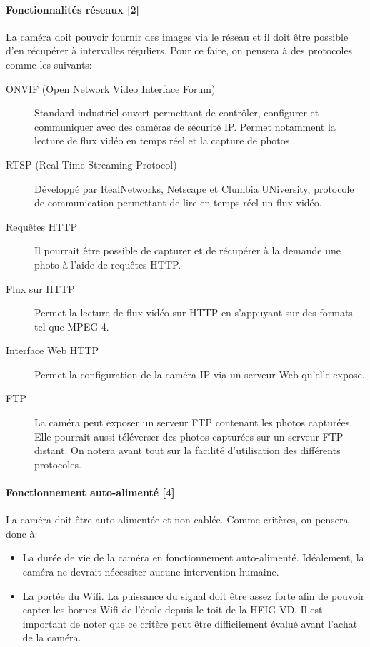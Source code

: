 \paragraph{Fonctionnalités réseaux [2]}
La caméra doit pouvoir fournir des images via le réseau et il doit être possible d'en récupérer à intervalles réguliers. Pour ce faire, on pensera à des protocoles comme les suivants: 
\begin{description}
    \item[ONVIF (Open Network Video Interface Forum)] Standard industriel ouvert permettant de contrôler, configurer et communiquer avec des caméras de sécurité IP. Permet notamment la lecture de flux vidéo en temps réel et la capture de photos \autocite{wiki:onvif}
    \item[RTSP (Real Time Streaming Protocol)] Développé par RealNetworks, Netscape et Clumbia UNiversity, protocole de communication permettant de lire en temps réel un flux vidéo. \autocite{wiki:RTSP}
    \item[Requêtes HTTP] Il pourrait être possible de capturer et de récupérer à la demande une photo à l'aide de requêtes HTTP.
    \item[Flux sur HTTP] Permet la lecture de flux vidéo sur HTTP en s'appuyant sur des formats tel que MPEG-4.
    \item[Interface Web HTTP] Permet la configuration de la caméra IP via un serveur Web qu'elle expose. 
    \item[FTP] La caméra peut exposer un serveur FTP contenant les photos capturées. Elle pourrait aussi téléverser des photos capturées sur un serveur FTP distant.
On notera avant tout sur la facilité d'utilisation des différents protocoles.
\end{description}

\paragraph{Fonctionnement auto-alimenté [4]}
La caméra doit être auto-alimentée et non cablée. Comme critères, on pensera donc à:
\begin{itemize}
    \item La durée de vie de la caméra en fonctionnement auto-alimenté. Idéalement, la caméra ne devrait nécessiter aucune intervention humaine.
    \item La portée du Wifi. La puissance du signal doit être assez forte afin de pouvoir capter les bornes Wifi de l'école depuis le toit de la HEIG-VD. Il est important de noter que ce critère peut être difficilement évalué avant l'achat de la caméra.
\end{itemize}

